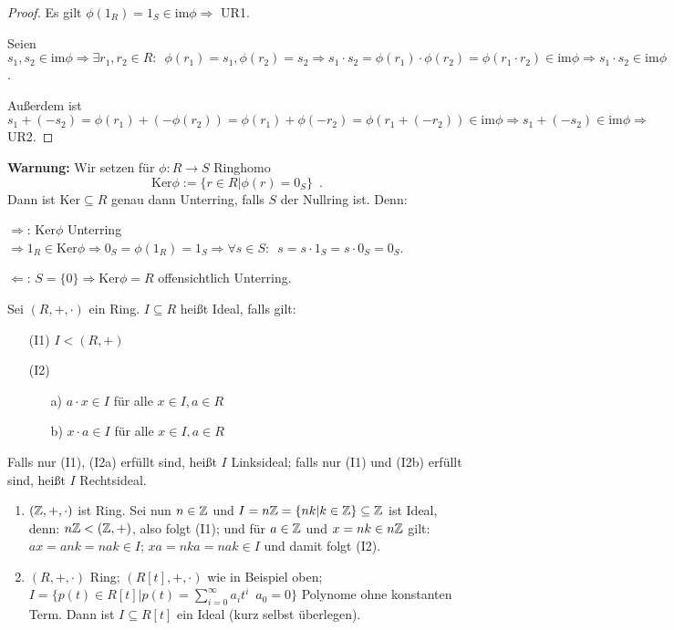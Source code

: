 \documentclass[12pt,a4paper]{scrartcl}
\begin{document}
\begin{proof}
	Es gilt $\phi(1_R) = 1_S\in\text{im}\phi\Rightarrow$ UR1.
	
	Seien $s_1, s_2\in\text{im}\phi\Rightarrow \exists r_1,r_2\in R:\enspace \phi (r_1) = s_1, \phi (r_2 )= s_2\Rightarrow s_1\cdot s_2 = \phi (r_1)\cdot \phi (r_2) = \phi(r_1\cdot r_2)\in \text{im}\phi\Rightarrow s_1\cdot s_2\in \text{im}\phi$.
	
	Außerdem ist $s_1+(-s_2) = \phi (r_1) + (-\phi (r_2)) = \phi (r_1)+\phi (-r_2) = \phi (r_1+(-r_2))\in\text{im}\phi\Rightarrow s_1+(-s_2)\in \text{im}\phi\Rightarrow$ UR2.
\end{proof}

\noindent
\textbf{Warnung:} Wir setzen für $\phi\colon R\to S$ Ringhomo
$$\text{Ker}\phi := \{r\in R|\phi(r)= 0_S\}\enspace.$$ Dann ist $\text{Ker}\subseteq R$ genau dann Unterring, falls $S$ der Nullring ist. Denn:

\glqq $\Rightarrow$\grqq: $\text{Ker}\phi$ Unterring $\Rightarrow 1_R\in \text{Ker}\phi\Rightarrow 0_S = \phi (1_R) = 1_S\Rightarrow \forall s\in S:\enspace s = s\cdot 1_S = s\cdot 0_S = 0_S$.

\grqq $\Leftarrow$\grqq: $S = \{0\}\Rightarrow \text{Ker}\phi = R$ offensichtlich Unterring.

\begin{defi}
	Sei $(R,+,\cdot)$ ein Ring. $I\subseteq R$ heißt Ideal, falls gilt:
	\begin{itemize}
		\item[(I1)] $I<(R,+)$
		\item[(I2)] \begin{itemize}
			\item[a)] $a\cdot x \in I$ für alle $x\in I, a\in R$
			\item[b)] $x\cdot a \in I$ für alle $x\in I, a\in R$
		\end{itemize}
	\end{itemize}
	Falls nur (I1), (I2a) erfüllt sind, heißt $I$ Linksideal; falls nur (I1) und (I2b) erfüllt sind, heißt $I$ Rechtsideal.
\end{defi}

\begin{bsp}
	\leavevmode
	\begin{enumerate}
		\item $(\mathbb Z,+,\cdot)$ ist Ring. Sei nun $n\in\mathbb Z$ und $I= n\mathbb Z = \{nk|k\in\mathbb Z\}\subseteq \mathbb Z$ ist Ideal, denn: $n\mathbb Z<(\mathbb Z,+)$, also folgt (I1); und für $a\in\mathbb Z$ und $x = nk\in n\mathbb Z$ gilt: $ax = ank = nak\in I$; $xa = nka  = nak \in I$ und damit folgt (I2).
		
		\item $(R,+,\cdot)$ Ring; $(R[t],+,\cdot)$ wie in Beispiel oben; $I = \{p(t)\in R[t]|p(t) = \sum_{i = 0}^{\infty}a_it^i\enspace a_0 = 0\}$ Polynome ohne konstanten Term. Dann ist $I\subseteq R[t]$ ein Ideal (kurz selbst überlegen).
	\end{enumerate}
\end{bsp}
\end{document}
